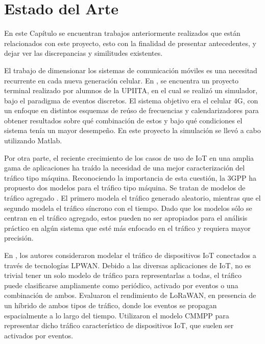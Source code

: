 \chapter{Estado del Arte}
\label{Chapter3} %

En este Capítulo se encuentran trabajos anteriormente realizados que están relacionados con este proyecto, esto con la finalidad de presentar antecedentes, y dejar ver las discrepancias y similitudes existentes.\newline

El trabajo de dimensionar los sistemas de comunicación móviles es una necesitad recurrente en cada nueva generación celular. En \parencite{Celis2016}, se encuentra un proyecto terminal realizado por alumnos de la UPIITA, en el cual se realizó un simulador, bajo el paradigma de eventos discretos. El sistema objetivo era el celular 4G, con un enfoque en distintos esquemas de reúso de frecuencias y calendarizadores para obtener resultados sobre qué combinación de estos y bajo qué condiciones el sistema tenía un mayor desempeño. En este proyecto la simulación se llevó a cabo utilizando Matlab.\newline

Por otra parte, el reciente crecimiento de los casos de uso de IoT en una amplia gama de aplicaciones ha traído la necesidad de una mejor caracterización del tráfico tipo máquina. Reconociendo la importancia de esta cuestión, la 3GPP ha propuesto dos modelos para el tráfico tipo máquina. Se tratan de modelos de tráfico agregado . El primero modela el tráfico generado aleatorio, mientras que el segundo modela el tráfico síncrono con el tiempo. Dado que los modelos sólo se centran en el tráfico agregado, estos pueden no ser apropiados para el análisis práctico en algún sistema que esté más enfocado en el tráfico y requiera mayor precisión.\newline

En \parencite{Gupta2018}, los autores consideraron modelar el tráfico de dispositivos IoT conectados a través de tecnologías LPWAN. Debido a las diversas aplicaciones de IoT, no es trivial tener un solo modelo de tráfico para representarlas a todas, el tráfico puede clasificarse ampliamente como periódico, activado por eventos o una combinación de ambos. Evaluaron el rendimiento de LoRaWAN, en presencia de un híbrido de ambos tipos de tráfico, donde los eventos se propagan espacialmente a lo largo del tiempo. Utilizaron el modelo CMMPP para representar dicho tráfico característico de dispositivos IoT, que suelen ser activados por eventos.  \newline

